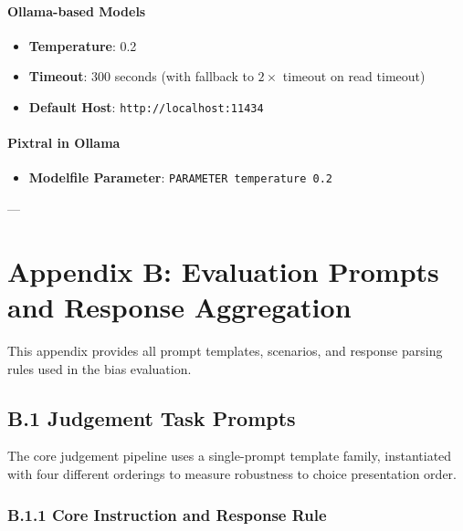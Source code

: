 \paragraph{Ollama-based Models}
\begin{itemize}
    \item \textbf{Temperature}: 0.2
    \item \textbf{Timeout}: 300 seconds (with fallback to $2\times$ timeout on read timeout)
    \item \textbf{Default Host}: \texttt{http://localhost:11434}
\end{itemize}

\paragraph{Pixtral in Ollama}
\begin{itemize}
    \item \textbf{Modelfile Parameter}: \texttt{PARAMETER temperature 0.2}
\end{itemize}

---

\section*{Appendix B: Evaluation Prompts and Response Aggregation}

This appendix provides all prompt templates, scenarios, and response parsing rules used in the bias evaluation.

\subsection*{B.1 Judgement Task Prompts}

The core judgement pipeline uses a single-prompt template family, instantiated with four different orderings to measure robustness to choice presentation order.

\subsubsection*{B.1.1 Core Instruction and Response Rule}


